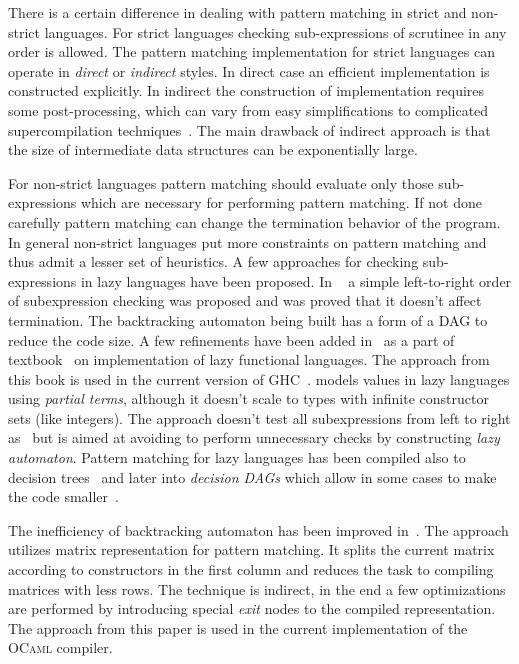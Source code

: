 There is a certain difference in dealing with pattern matching in strict and non-strict languages. For strict languages checking sub-expressions of scrutinee in any order is allowed.
The pattern matching implementation for strict languages can operate in \emph{direct} or \emph{indirect} styles. In direct case an efficient implementation is constructed
explicitly. In indirect the construction of implementation requires some post-processing, which can vary from easy simplifications to complicated supercompilation
techniques~\cite{sestoft1996}. The main drawback of indirect approach is that the size of intermediate data structures can be exponentially large.

For non-strict languages pattern matching should evaluate only those sub-expressions which are necessary for performing pattern matching. If not done carefully pattern matching can
change the termination behavior of the program. In general non-strict languages put more constraints on pattern matching and thus admit a lesser set of heuristics. 
A few approaches for checking sub-expressions in lazy languages have been proposed. In ~\cite{augustsson1985} a simple left-to-right order of subexpression checking was proposed
and was proved that it doesn't affect termination. The backtracking automaton being built has a form of a DAG to reduce the code size. A few refinements have been added in~\cite{wadler1987}
as a part of textbook~\cite{peytonjones1987} on implementation of lazy functional languages. The approach from this book is used in the current version of GHC~\cite{marlow2012the}.
\cite{laville1991} models values in lazy languages using \emph{partial terms}, although it doesn't scale to types with infinite constructor sets (like integers). The approach doesn't
test all subexpressions from left to right as~\cite{augustsson1985} but is aimed at avoiding to perform unnecessary checks by constructing \emph{lazy automaton}. Pattern matching for
lazy languages has been compiled also to decision trees~\cite{maranget1992} and later into \emph{decision DAGs} which allow in some cases to make the code
smaller~\cite{maranget1994}.

The inefficiency of backtracking automaton has been
improved in~\cite{maranget2001}. The approach utilizes matrix representation for pattern matching. It splits the current matrix according to constructors in the
first column and reduces the task to compiling matrices with less rows. The technique is indirect, in the end a few optimizations are performed by introducing
special \emph{exit} nodes to the compiled representation. %
The approach from this paper is used in the current implementation of the \textsc{OCaml} compiler.

